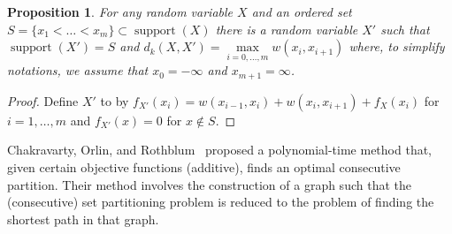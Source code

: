 \documentclass{article}
\newtheorem{proposition}[thm]{Proposition}
\DeclareMathOperator{\support}{support}
\begin{document}
\begin{proposition}
	For any random variable $X$ and an ordered set $S=\{x_1<\dots<x_m\} \subset \support(X)$ there is a random variable $X'$ such that $\support(X')=S$ and $d_k(X,X') = \max\limits_{i=0,\dots,m} w(x_{i}, x_{i+1})$ where, to simplify notations, we assume that $x_0=-\infty$ and $x_{m+1}=\infty$.
\end{proposition}

\begin{proof}
Define $X'$ to by $f_{X'}(x_i) = w(x_{i-1},x_i) + w(x_i,x_{i+1}) + f_{X}(x_i)$ for $i=1,\dots,m$ and $f_{X'}(x)=0$ for $x \notin S$.
\end{proof}

Chakravarty, Orlin, and Rothblum~\cite{chakravarty1982partitioning} proposed a polynomial-time method that, given certain objective functions (additive), finds an optimal consecutive partition. Their method involves the construction of a graph such that the (consecutive) set partitioning problem is reduced to the problem of finding the shortest path in that graph.
\end{document}
